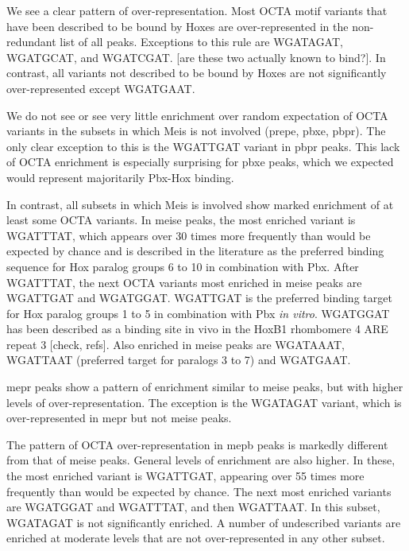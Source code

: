 We see a clear pattern of over-representation. Most \ac{OCTA} motif variants that have been described to be bound by Hoxes are over-represented in the non-redundant list of all peaks. Exceptions to this rule are WGATAGAT, WGATGCAT, and WGATCGAT. [are these two actually known to bind?]. In contrast, all variants not described to be bound by Hoxes are not significantly over-represented except WGATGAAT. %

We do not see or see very little enrichment over random expectation of \ac{OCTA} variants in the subsets in which Meis is not involved (\ac{prepe}, \ac{pbxe}, \ac{pbpr}). The only clear exception to this is the WGATTGAT variant in \ac{pbpr} peaks. This lack of \ac{OCTA} enrichment is especially surprising for \ac{pbxe} peaks, which we expected would represent majoritarily Pbx-Hox binding.

In contrast, all subsets in which Meis is involved show marked enrichment of at least some \ac{OCTA} variants. In \ac{meise} peaks, the most enriched variant is WGATTTAT, which appears over 30 times more frequently than would be expected by chance and is described in the literature as the preferred binding sequence for Hox paralog groups 6 to 10 in combination with Pbx. After WGATTTAT, the next \ac{OCTA} variants most enriched in \ac{meise} peaks are WGATTGAT and WGATGGAT. WGATTGAT is the preferred binding target for Hox paralog groups 1 to 5 in combination with Pbx \textit{in vitro}. WGATGGAT has been described as a binding site in vivo in the HoxB1 rhombomere 4 \ac{ARE} repeat 3 [check, refs]. Also enriched in \ac{meise} peaks are WGATAAAT, WGATTAAT (preferred target for paralogs 3 to 7) and WGATGAAT. 

\ac{mepr} peaks show a pattern of enrichment similar to \ac{meise} peaks, but with higher levels of over-representation. The exception is the WGATAGAT variant, which is over-represented in \ac{mepr} but not \ac{meise} peaks.
 
The pattern of \ac{OCTA} over-representation in \ac{mepb} peaks is markedly different from that of \ac{meise} peaks. General levels of enrichment are also higher. In these, the most enriched variant is WGATTGAT, appearing over 55 times more frequently than would be expected by chance. The next most enriched variants are WGATGGAT and WGATTTAT, and then WGATTAAT. In this subset, WGATAGAT is not significantly enriched. A number of undescribed variants are enriched at moderate levels that are not over-represented in any other subset. 

